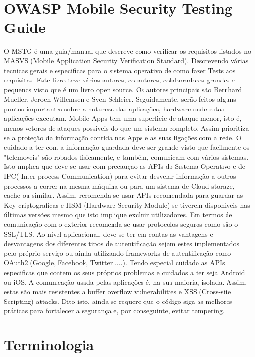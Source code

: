 \section{OWASP Mobile Security Testing Guide}

	O MSTG é uma guia/manual que descreve como verificar os requisitos listados no MASVS (Mobile Application Security Verification Standard). Descrevendo várias tecnicas gerais e especificas para o sistema operativo de como fazer Tests aos requisitos. Este livro teve vários autores, co-autores, colaboradores grandes e pequenos visto que é um livro open source. Os autores principais são Bernhard Mueller, Jeroen Willemsen e Sven Schleier.
	Seguidamente, serão feitos alguns pontos importantes sobre a natureza das aplicações, hardware onde estas aplicações executam.
	Mobile Apps tem uma superficie de ataque menor, isto é, menos vetores de ataques possíveis do que um sistema completo. Assim prioritiza-se a proteção da informação contida nas Apps e as suas ligações com a rede.
	O cuidado a ter com a informação guardada deve ser grande visto que facilmente os "telemoveis" são robados fisicamente, e também, comunicam com vários sistemas. Isto implica que deve-se usar com precaução as APIs do Sistema Operativo e de IPC( Inter-process Communication) para evitar desvelar informação a outros processos a correr na mesma máquina ou para um sistema de Cloud storage, cache ou similar. Assim, recomenda-se usar APIs recomendada para guardar as Key criptograficas e HSM (Hardware Security Module) se tiverem disponiveis nas últimas versões mesmo que isto implique excluir utilizadores. Em termos de comunicação com o exterior recomenda-se usar protocolos seguros como são o SSL/TLS.
	Ao nivel aplicacional, deve-se ter em contas as vantagens e desvantagens dos diferentes tipos de autentificação sejam estes implementados pelo próprio serviço ou ainda utilizando frameworks de autentificação como OAuth2 (Google, Facebook, Twitter ....). Tendo especial cuidado as APIs especificas que contem os seus próprios problemas e cuidados a ter seja Android ou iOS.
	A comunicação usada pelas aplicações é, na sua maioria, isolada. Assim, estas são mais resistentes a buffer overflow vulnerabilities e XSS (Cross-site Scripting) attacks. Dito isto, ainda se requere que o código siga as melhores práticas para fortalecer a segurança e, por conseguinte, evitar tampering.

\section{Terminologia}

